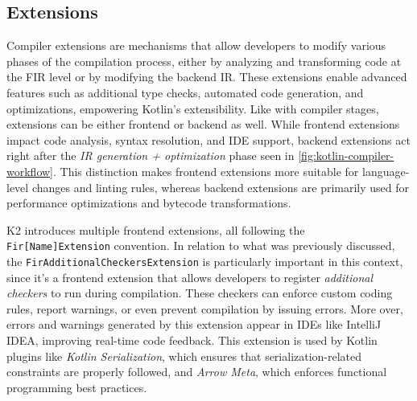 \documentclass[12pt,a4paper,openright,twoside]{book}
\begin{document}
\subsection{Extensions}

Compiler extensions are mechanisms that allow developers to modify various
phases of the compilation process, either by analyzing and transforming code at
the \ac{FIR} level or by modifying the backend \ac{IR}. These extensions
enable advanced features such as additional type checks, automated code
generation, and optimizations, empowering Kotlin’s extensibility.
%
Like with compiler stages, extensions can be either frontend or backend as well.
While frontend extensions impact code analysis, syntax resolution, and IDE
support, backend extensions act right after the \emph{IR generation +
optimization} phase seen in \cref{fig:kotlin-compiler-workflow}. This
distinction makes frontend extensions more suitable for language-level changes
and linting rules, whereas backend extensions are primarily used for performance
optimizations and bytecode transformations.

K2 introduces multiple frontend extensions, all following the
\lstinline{Fir[Name]Extension} convention. In relation to what was previously
discussed, the \lstinline{FirAdditionalCheckersExtension} is particularly
important in this context, since it's a frontend extension that allows
developers to register \emph{additional checkers} to run during compilation.
These checkers can enforce custom coding rules, report warnings, or even prevent
compilation by issuing errors. More over, errors and warnings generated by this
extension appear in IDEs like IntelliJ IDEA, improving real-time code feedback.
This extension is used by Kotlin plugins like \emph{Kotlin Serialization},
which ensures that serialization-related constraints are properly followed, and
\emph{Arrow Meta}, which enforces functional programming best practices.
\end{document}

